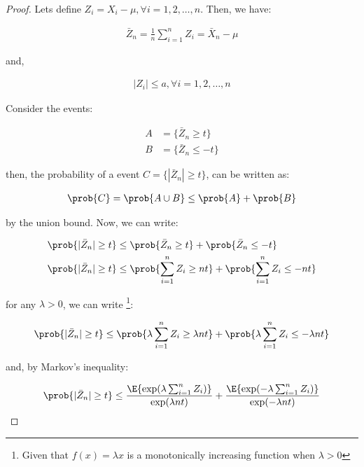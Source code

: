 \begin{proof}
Lets define $Z_i = X_i - \mu, \forall i = 1, 2, \dots, n$. Then, we have:

\begin{align*}
\bar{Z}_n = \frac{1}{n} \sum_{i=1}^n Z_i = \bar{X}_n - \mu
\end{align*}

and,

\begin{align*}
|Z_i| \leq a, \forall i = 1, 2, \dots , n
\end{align*}

Consider the events:

\begin{align*}
A &= \{\bar{Z}_n \geq t\}\\
B &= \{\bar{Z}_n \leq -t\}
\end{align*}

then, the probability of a event $C = \{|\bar{Z}_n| \geq t\}$, can be written as:

\begin{align*}
\prob{C} &= \prob{A \cup B} \leq \prob{A} + \prob{B} \\
\end{align*}

by the union bound. Now, we can write:

\begin{align*}
\prob{|\bar{Z}_n| \geq t} &\leq \prob{\bar{Z}_n \geq t} + \prob{\bar{Z}_n \leq -t}\\
\prob{|\bar{Z}_n| \geq t} &\leq \prob{\sum_{i=1}^n Z_i \geq nt} + \prob{\sum_{i=1}^n Z_i \leq -nt}\\
\end{align*}

for any $\lambda > 0$, we can write \footnote{Given that $f(x) = \lambda x$ is a monotonically increasing function when $\lambda > 0$}:

\begin{align*}
\prob{|\bar{Z}_n| \geq t} &\leq \prob{\lambda \sum_{i=1}^n Z_i \geq \lambda nt} + \prob{\lambda \sum_{i=1}^n Z_i \leq -\lambda nt}\\
\end{align*}

and, by Markov's inequality:

\begin{align*}
\prob{|\bar{Z}_n| \geq t} &\leq
    \frac{\E{\exp(\lambda \sum_{i=1}^n Z_i)}}{\exp(\lambda nt)} + 
    \frac{\E{\exp(-\lambda \sum_{i=1}^n Z_i)}}{\exp(-\lambda nt)}\\
\end{align*}


\end{proof}
